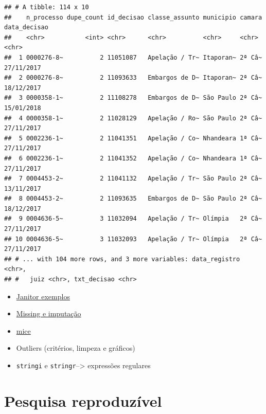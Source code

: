 \documentclass[
  10pt,
  ignorenonframetext,
]{beamer}
\begin{document}
\begin{frame}[fragile]{}
\protect\hypertarget{section-9}{}
\begin{verbatim}
## # A tibble: 114 x 10
##    n_processo dupe_count id_decisao classe_assunto municipio camara data_decisao
##    <chr>           <int> <chr>      <chr>          <chr>     <chr>  <chr>       
##  1 0000276-8~          2 11051087   Apelação / Tr~ Itaporan~ 2ª Câ~ 27/11/2017  
##  2 0000276-8~          2 11093633   Embargos de D~ Itaporan~ 2ª Câ~ 18/12/2017  
##  3 0000358-1~          2 11108278   Embargos de D~ São Paulo 2ª Câ~ 15/01/2018  
##  4 0000358-1~          2 11028129   Apelação / Ro~ São Paulo 2ª Câ~ 27/11/2017  
##  5 0002236-1~          2 11041351   Apelação / Co~ Nhandeara 1ª Câ~ 27/11/2017  
##  6 0002236-1~          2 11041352   Apelação / Co~ Nhandeara 1ª Câ~ 27/11/2017  
##  7 0004453-2~          2 11041132   Apelação / Tr~ São Paulo 2ª Câ~ 13/11/2017  
##  8 0004453-2~          2 11093635   Embargos de D~ São Paulo 2ª Câ~ 18/12/2017  
##  9 0004636-5~          3 11032094   Apelação / Tr~ Olímpia   2ª Câ~ 27/11/2017  
## 10 0004636-5~          3 11032093   Apelação / Tr~ Olímpia   2ª Câ~ 27/11/2017  
## # ... with 104 more rows, and 3 more variables: data_registro <chr>,
## #   juiz <chr>, txt_decisao <chr>
\end{verbatim}
\end{frame}

\begin{frame}[fragile]{}
\protect\hypertarget{section-10}{}
\begin{itemize}
\item
  \href{http://sfirke.github.io/janitor/articles/janitor.html}{Janitor
  exemplos}
\item
  \href{https://www.analyticsvidhya.com/blog/2016/03/tutorial-powerful-packages-imputing-missing-values/}{Missing
  e imputação}
\item
  \href{https://amices.org/mice/}{mice}
\item
  Outliers (critérios, limpeza e gráficos)
\item
  \texttt{stringi} e \texttt{stringr}--\textgreater{} expressões
  regulares
\end{itemize}
\end{frame}

\hypertarget{pesquisa-reproduzuxedvel}{%
\section{Pesquisa reproduzível}\label{pesquisa-reproduzuxedvel}}
\end{document}
